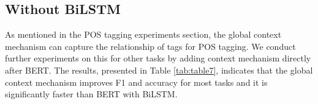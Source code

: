 \documentclass[lettersize,journal]{IEEEtran}
\begin{document}
\subsection{Without BiLSTM}
As mentioned in the POS tagging experiments section, the global context mechanism can capture the relationship of tags for POS tagging. We conduct further experiments on this for other tasks by adding context mechanism directly after BERT. The results, presented in Table \ref{tab:table7}, indicates that the global context mechanism improves F1 and accuracy for most tasks and it is significantly faster than BERT with BiLSTM. 

\begin{CJK*}{UTF8}{gbsn}

\begin{table*}[]
\centering
{}
\caption{Weibo case analysis. The errors are in yellow.\label{tab:table8}}
\end{table*}
\end{CJK*}
\end{document}
